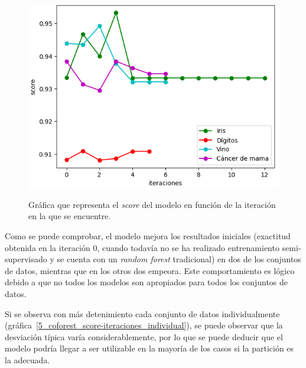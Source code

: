 \begin{figure}[h]
	\caption{Gráfica que representa el \textit{score} del modelo en función de la iteración en la que se encuentre.}
	\centering
	\includegraphics[scale=0.75]{../img/memoria/5_coforest_score-iteraciones}
	\label{5_coforest_score-iteraciones}
\end{figure}

Como se puede comprobar, el modelo mejora los resultados iniciales (exactitud obtenida en la iteración $0$, cuando todavía no se ha realizado entrenamiento semi-supervisado y se cuenta con un \textit{random forest} tradicional) en dos de los conjuntos de datos, mientras que en los otros dos empeora. Este comportamiento es lógico debido a que no todos los modelos son apropiados para todos los conjuntos de datos. 

Si se observa con más detenimiento cada conjunto de datos individualmente (gráfica~\ref{5_coforest_score-iteraciones_individual}), se puede observar que la desviación típica varía considerablemente, por lo que se puede deducir que el modelo podría llegar a ser utilizable en la mayoría de los casos si la partición es la adecuada.

